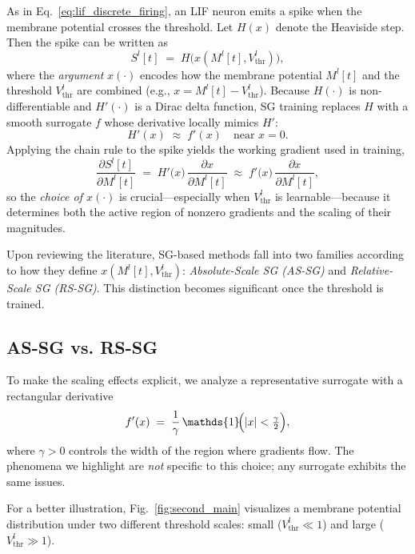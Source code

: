 As in Eq.~\ref{eq:lif_discrete_firing}, an LIF neuron emits a spike when the membrane potential crosses the threshold. Let \(H(x)\) denote the Heaviside step. Then the spike can be written as
\[
S^l[t] \;=\; H\!\bigl(x(M^l[t],V^l_{\text{thr}})\bigr),
\]
where the \emph{argument} \(x(\cdot)\) encodes how the membrane potential \(M^l[t]\) and the threshold \(V^l_{\text{thr}}\) are combined (e.g., \(x=M^l[t]-V^l_{\text{thr}}\)). 
Because \(H(\cdot)\) is non-differentiable and \(H'(\cdot)\) is a Dirac delta function, SG training replaces \(H\) with a smooth surrogate \(f\) whose derivative locally mimics \(H'\):
\[
H'(x)\;\approx\; f'(x)\quad\text{near }x=0.
\]
Applying the chain rule to the spike yields the working gradient used in training,
\begin{equation}
\label{eq:def_of_srgd}
\frac{\partial S^l[t]}{\partial M^l[t]}
\;=\;
H'\!\bigl(x\bigr)\,\frac{\partial x}{\partial M^l[t]}
\;\approx\;
f'\!\bigl(x\bigr)\,\frac{\partial x}{\partial M^l[t]},
\end{equation}
so the \emph{choice of \(x(\cdot)\)} is crucial—especially when \(V^l_{\text{thr}}\) is learnable—because it determines both the active region of nonzero gradients and the scaling of their magnitudes.

Upon reviewing the literature, SG-based methods fall into two families according to how they define \(x(M^l[t],V^l_{\text{thr}})\): \emph{Absolute-Scale SG (AS-SG)} and \emph{Relative-Scale SG (RS-SG)}. This distinction becomes significant once the threshold is trained.

\subsection{AS-SG vs. RS-SG}
\label{sec:type1_type2}

To make the scaling effects explicit, we analyze a representative surrogate with a rectangular derivative
\[
f'(x) \;=\; \frac{1}{\gamma}\,\mathds{1}\!\Bigl(|x|<\tfrac{\gamma}{2}\Bigr),
\]
where $\gamma>0$ controls the width of the region where gradients flow. The phenomena we highlight are \emph{not} specific to this choice; any surrogate exhibits the same issues.

For a better illustration, Fig.~\ref{fig:second_main} visualizes a membrane potential distribution under two different threshold scales: small ($V_{\text{thr}}^{l}\!\ll\!1$) and large ($V_{\text{thr}}^{l}\!\gg\!1$).

